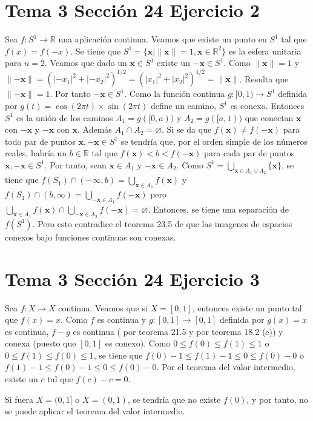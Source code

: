 \documentclass{article}
\newcommand{\vect}[1]{\boldsymbol{#1}}
\begin{document}
\section{Tema 3 Sección 24 Ejercicio 2}
Sea $f:S^1\rightarrow \mathbb{R}$
una aplicación continua. Veamos que existe un punto en $S^1$ tal que $f(x)=f(-x)$. Se tiene que $S^1=\{\vect{x}| \lVert \vect{x}\rVert=1,\vect{x}\in \mathbb{R}^2\}$ es la esfera unitaria para $n=2$. Veamos que dado un $\vect{x}\in S^1$ existe un $-\vect{x}\in S^1$. Como $\lVert \vect{x}\rVert=1$ y $\lVert -\vect{x}\rVert=(|-x_1|^2+|-x_2|^2)^{1/2}= (|x_1|^2+|x_2|^2)^{1/2}=\lVert \vect{x}\rVert$. Resulta que $\lVert -\vect{x}\rVert=1$. Por tanto $-\vect{x}\in S^1$. Como la función continua $g:[0,1)\rightarrow S^1$ definida por $g(t)=\cos(2\pi t)\times\sin(2\pi t)$ define un camino, $S^1$ es conexo. Entonces $S^1$ es la unión de los caminos $A_{1}=g([0,a))$ y $A_{2}=g([a,1))$ que conectan $\vect{x}$ con $-\vect{x}$ y $-\vect{x}$ con $\vect{x}$. Además $A_{1}\cap A_{2}=\varnothing$. Si se da que $f(\vect{x})\neq f(-\vect{x})$ para todo par de puntos $\vect{x},-\vect{x}\in S^1$ se tendría que, por el orden simple de los números reales, habría un $b\in\mathbb{R}$ tal que $f(\vect{x})< b<f(-\vect{x})$ para cada par de puntos $\vect{x},-\vect{x}\in S^1$. Por tanto, sean $\vect{x}\in A_1$ y $-\vect{x}\in A_2$. Como $S^1= \bigcup_{\vect{x}\in A_{1}\cup A_{2}}\{\vect{x}\}$, se tiene que $f(S_1)\cap (-\infty, b)= \bigcup_{\vect{x}\in A_{1}}f(\vect{x})$ y  $f(S_1)\cap (b,\infty)=\bigcup_{-\vect{x}\in A_{1}}f(-\vect{x})$ pero  $\bigcup_{\vect{x}\in A_{1}}f(\vect{x})\cap \bigcup_{-\vect{x}\in A_{2}}f(-\vect{x})=\varnothing$. Entonces, se tiene una separación de $f(S^1)$. Pero esto contradice el teorema 23.5 de que las imagenes de espacios conexos bajo funciones continuas son conexas.
\section{Tema 3 Sección 24 Ejercicio 3}
Sea $f:X\rightarrow X$ continua. Veamos que si $X=[0,1]$, entonces existe un punto tal que $f(x)=x$. Como $f$ es continua y $g:[0,1]\rightarrow[0,1]$ definida por $g(x)=x$ es continua, $f-g$ es continua ( por teorema 21.5 y por teorema 18.2 (e)) y conexa (puesto que $[0,1]$ es conexo). Como $0\leq f(0)\leq f(1)\leq 1$ o $0\leq f(1)\leq f(0)\leq 1$, se tiene que $ f(0)-1\leq f(1)-1\leq 0 \leq f(0)-0$ o $f(1)-1\leq f(0)-1\leq 0\leq f(0)-0$. Por el teorema del valor intermedio, existe un $c$ tal que $f(c)-c=0$.

Si fuera $X=(0,1]$ o $X=(0,1)$, se tendría que no existe $f(0)$, y por tanto, no se puede aplicar el teorema del valor intermedio.
\end{document}
